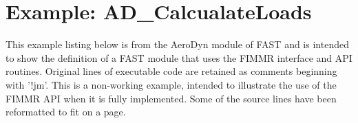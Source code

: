 \documentclass[11pt]{article}
\begin{document}
\begin{verbatim}
\end{verbatim}


\section{Example: AD\_CalcualateLoads}
\label{sec:listing}

This example listing below is from the AeroDyn module of FAST and is intended to show
the definition of a FAST module that uses the FIMMR interface and API routines.
Original
lines of executable code are retained as comments beginning with '!jm'.  This is a non-working
example, intended to illustrate the use of the FIMMR API when it is fully implemented.
Some of the
source lines have been reformatted to fit on a page.  
\end{document}
